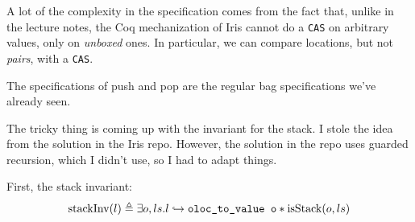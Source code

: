 A lot of the complexity in the specification comes from the fact that, unlike in the lecture notes, the Coq mechanization of Iris cannot do a \texttt{CAS} on arbitrary values, only on \emph{unboxed} ones. In particular, we can compare locations, but not \emph{pairs}, with a \texttt{CAS}. 

The specifications of push and pop are the regular bag specifications we've already seen.

The tricky thing is coming up with the invariant for the stack. I stole the idea from the solution in the Iris repo. However, the solution in the repo uses guarded recursion, which I didn't use, so I had to adapt things.

First, the stack invariant:
\[
\text{stackInv}(l) \triangleq \exists o, ls. l \hookrightarrow \texttt{oloc\_to\_value o} * \text{isStack}(o, ls)
\]

